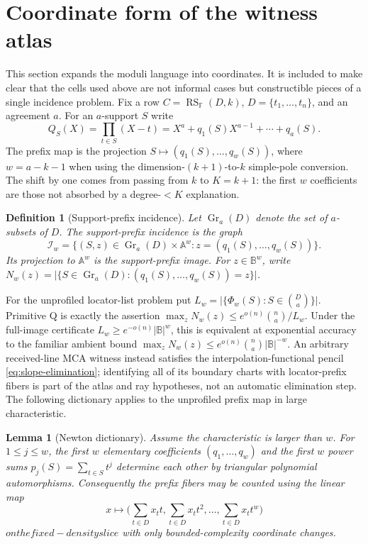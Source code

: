 \documentclass[12pt,a4paper]{amsart}
\numberwithin{equation}{section}
\newtheorem{lemma}[lemma]{Lemma}
\newtheorem{definition}[definition]{Definition}
\theoremstyle{remark}
\DeclareMathOperator{\RS}{RS}
\DeclareMathOperator{\Gr}{Gr}
\newcommand{\F}{\mathbb F}
\newcommand{\B}{\mathbb B}
\newcommand{\A}{\mathbb A}
\newcommand{\abs}[1]{\lvert #1\rvert}
\begin{document}
\section{Coordinate form of the witness atlas}\label{sec:coordinate-atlas}

This section expands the moduli language into coordinates.  It is included to make clear that the cells used above are not informal cases but constructible pieces of a single incidence problem.  Fix a row \(C=\RS_\F(D,k)\), \(D=\{t_1,\ldots,t_n\}\), and an agreement \(a\).  For an \(a\)-support \(S\) write
\[
        Q_S(X)=\prod_{t\in S}(X-t)
        =X^a+q_1(S)X^{a-1}+\cdots+q_a(S).
\]
The prefix map is the projection
\(S\mapsto(q_1(S),\ldots,q_w(S))\), where \(w=a-k-1\) when using the
dimension-\((k+1)\)-to-\(k\) simple-pole conversion.  The shift by one
comes from passing from \(k\) to \(K=k+1\): the first \(w\) coefficients
are those not absorbed by a degree-\(<K\) explanation.

\begin{definition}[Support-prefix incidence]\label{def:support-prefix-incidence}
Let \(\Gr_a(D)\) denote the set of \(a\)-subsets of \(D\).
The \emph{support-prefix incidence} is the graph
\[
 \mathcal I_w=\{(S,z)\in\Gr_a(D)\times\A^w:
       z=(q_1(S),\ldots,q_w(S))\}.
\]
Its projection to \(\A^w\) is the \emph{support-prefix image}.
For \(z\in\B^w\), write \(N_w(z)=\abs{\{S\in\Gr_a(D): (q_1(S),\ldots,q_w(S))=z\}}\).
\end{definition}

For the unprofiled locator-list problem put
\(L_w=\abs{\{\Phi_w(S):S\in\binom Da\}}\).  Primitive Q is exactly the
assertion
\(\max_zN_w(z)\le e^{o(n)}\binom na/L_w\).  Under the full-image
certificate \(L_w\ge e^{-o(n)}\abs\B^w\), this is equivalent at
exponential accuracy to the familiar ambient bound
\(\max_zN_w(z)\le e^{o(n)}\binom na\abs\B^{-w}\).  An arbitrary
received-line MCA witness instead satisfies the interpolation-functional
pencil \eqref{eq:slope-elimination}; identifying all of its boundary charts
with locator-prefix fibers is part of the atlas and ray hypotheses, not an
automatic elimination step.  The following dictionary applies to the
unprofiled prefix map in large characteristic.

\begin{lemma}[Newton dictionary]\label{lem:newton-dictionary-expanded}
Assume the characteristic is larger than \(w\).  For \(1\le j\le w\),
the first \(w\) elementary coefficients \((q_1,\ldots,q_w)\) and the first
\(w\) power sums \(p_j(S)=\sum_{t\in S}t^j\) determine each other by
triangular polynomial automorphisms.  Consequently the prefix fibers may
be counted using the linear map
\[
        x\longmapsto \biggl(\sum_{t\in D}x_t t,
        \sum_{t\in D}x_t t^2,
        \ldots,
        \sum_{t\in D}x_t t^w\biggr)
\]
\(on the fixed-density slice\) with only bounded-complexity coordinate changes.
\end{lemma}
\end{document}
